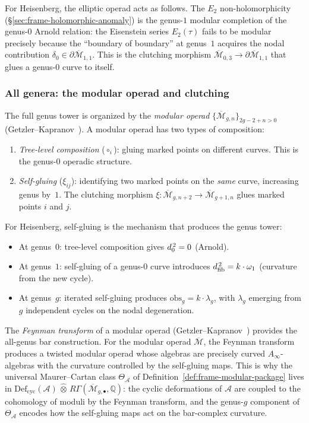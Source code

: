 For Heisenberg, the elliptic operad acts as follows.  The
$E_2$ non-holomorphicity (\S\ref{sec:frame-holomorphic-anomaly})
is the genus-$1$ modular completion of the genus-$0$ Arnold
relation: the Eisenstein series $E_2(\tau)$ fails to be modular
precisely because the ``boundary of boundary'' at genus~$1$
acquires the nodal contribution $\delta_0 \in
\partial\overline{\mathcal{M}}_{1,1}$.  This is the clutching
morphism $\overline{\mathcal{M}}_{0,3} \to
\partial\overline{\mathcal{M}}_{1,1}$ that glues a genus-$0$
curve to itself.

\subsubsection*{All genera: the modular operad and clutching}

The full genus tower is organized by the \emph{modular operad}
$\{\overline{\mathcal{M}}_{g,n}\}_{2g-2+n>0}$
(Getzler--Kapranov~\cite{GeK98}).  A modular operad has two types of
composition:
\begin{enumerate}
\item \emph{Tree-level composition} ($\circ_i$): gluing marked
  points on different curves. This is the genus-$0$ operadic
  structure.
\item \emph{Self-gluing} ($\xi_{ij}$): identifying two marked
  points on the \emph{same} curve, increasing genus by~$1$.
  The clutching morphism
  $\xi \colon \overline{\mathcal{M}}_{g,n+2}
  \to \overline{\mathcal{M}}_{g+1,n}$
  glues marked points $i$ and $j$.
\end{enumerate}

For Heisenberg, self-gluing is the mechanism that produces the
genus tower:
\begin{itemize}
\item At genus~$0$: tree-level composition gives $d_0^{\,2} = 0$
  (Arnold).
\item At genus~$1$: self-gluing of a genus-$0$ curve introduces
  $d_{\mathrm{fib}}^{\,2} = k \cdot \omega_1$ (curvature from the new cycle).
\item At genus~$g$: iterated self-gluing produces
  $\mathrm{obs}_g = k \cdot \lambda_g$, with $\lambda_g$ emerging
  from $g$ independent cycles on the nodal degeneration.
\end{itemize}

The \emph{Feynman transform} of a modular operad (Getzler--Kapranov~\cite{GeK98})
provides the all-genus bar construction.  For the modular operad
$\overline{\mathcal{M}}$, the Feynman transform produces a twisted
modular operad whose algebras are precisely curved
$A_\infty$-algebras with the curvature controlled by the
self-gluing maps.  This is why the universal Maurer--Cartan class
$\Theta_{\mathcal{A}}$ of Definition~\ref{def:frame-modular-package}
lives in $\mathrm{Def}_{\mathrm{cyc}}(\mathcal{A})
\,\widehat{\otimes}\, R\Gamma(\overline{\mathcal{M}}_{g,\bullet},
\mathbb{Q})$: the cyclic deformations of $\mathcal{A}$ are coupled
to the cohomology of moduli by the Feynman transform, and the
genus-$g$ component of $\Theta_{\mathcal{A}}$ encodes how the
self-gluing maps act on the bar-complex curvature.

